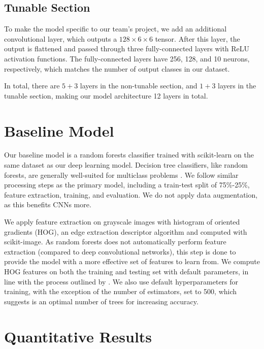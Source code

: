 \documentclass{article} %
\begin{document}
\subsection{Tunable Section}
\label{sec:tunable_section}
To make the model specific to our team's project, we add an additional convolutional layer, which outputs a $128\times6\times6$ tensor. After this layer, the output is flattened and passed through three fully-connected layers with ReLU activation functions. The fully-connected layers have 256, 128, and 10 neurons, respectively, which matches the number of output classes in our dataset.

In total, there are $5+3$ layers in the non-tunable section, and $1+3$ layers in the tunable section, making our model architecture 12 layers in total.

\section{Baseline Model}
\label{sec:baseline}
Our baseline model is a random forests classifier trained with scikit-learn on the same dataset as our deep learning model. Decision tree classifiers, like random forests, are generally well-suited for multiclass problems \citep{GallRazaviEtAl.IntroductionRandomForests.2012}. We follow similar processing steps as the primary model, including a train-test split of 75\%-25\%, feature extraction, training, and evaluation. We do not apply data augmentation, as this benefits CNNs more.

We apply feature extraction on grayscale images with histogram of oriented gradients (HOG), an edge extraction descriptor algorithm \citep{N.DalalB.Triggs.HistogramsOrientedGradients.2005} and computed with scikit-image. As random forests does not automatically perform feature extraction (compared to deep convolutional networks), this step is done to provide the model with a more effective set of features to learn from. We compute HOG features on both the training and testing set with default parameters, in line with the process outlined by \cite{Dutta.RandomForestImage.2024}. We also use default hyperparameters for training, with the exception of the number of estimators, set to 500, which suggests is an optimal number of trees for increasing accuracy.

\section{Quantitative Results}
\label{sec:quantitative_results}
\end{document}
